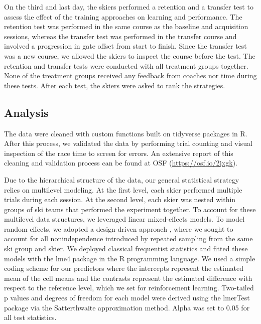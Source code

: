 \documentclass[pdflatex,sn-mathphys-num]{sn-jnl}%
\theoremstyle{thmstyleone}%
\theoremstyle{thmstyletwo}%
\theoremstyle{thmstylethree}%
\begin{document}
On the third and last day, the skiers performed a retention and a transfer test to assess the effect of the training approaches on learning and performance. The retention test was performed in the same course as the baseline and acquisition sessions, whereas the transfer test was performed in the transfer course and involved a progression in gate offset from start to finish. Since the transfer test was a new course, we allowed the skiers to inspect the course before the test. The retention and transfer tests were conducted with all treatment groups together. None of the treatment groups received any feedback from coaches nor time during these tests. After each test, the skiers were asked to rank the strategies. 

\subsection{Analysis}
The data were cleaned with custom functions built on tidyverse \cite{wickham_welcome_2019} packages in R. After this process, we validated the data by performing trial counting and visual inspection of the race time to screen for errors. An extensive report of this cleaning and validation process can be found at OSF  (\url{https://osf.io/2jxgk}).

Due to the hierarchical structure of the data, our general statistical strategy relies on multilevel modeling. At the first level, each skier performed multiple trials during each session. At the second level, each skier was nested within groups of ski teams that performed the experiment together. To account for these multilevel data structures, we leveraged linear mixed-effects models. To model random effects, we adopted a design-driven approach \cite{barr_random_2013, barr_learning_2021}, where we sought to account for all nonindependence introduced by repeated sampling from the same ski group and skier. We deployed classical frequentist statistics and fitted these models with the lme4 package \cite{bates_fitting_2015} in the R programming language. We used a simple coding scheme for our predictors where the intercepts represent the estimated mean of the cell means and the contrasts represent the estimated difference with respect to the reference level, which we set for reinforcement learning. Two-tailed p values and degrees of freedom for each model were derived using the lmerTest package \cite{kuznetsova_lmertest_2017} via the Satterthwaite approximation method. Alpha was set to 0.05 for all test statistics.
\end{document}
